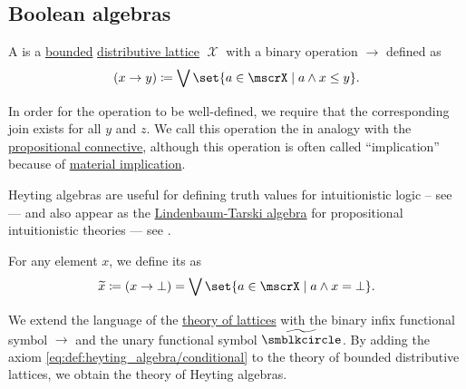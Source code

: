 \subsection{Boolean algebras}\label{subsec:boolean_algebras}

\begin{definition}\label{def:heyting_algebra}
  A  is a \hyperref[def:semilattice/bounded]{bounded} \hyperref[def:semilattice/distributive_lattice]{distributive lattice} \( \mscrX \) with a binary operation \( \rightarrow \) defined as
  \begin{equation}\label{eq:def:heyting_algebra/conditional}
    (x \rightarrow y) \coloneqq \bigvee\set{ a \in \mscrX \given a \wedge x \leq y }.
  \end{equation}

  In order for the operation to be well-defined, we require that the corresponding join exists for all \( y \) and \( z \). We call this operation the  in analogy with the \hyperref[def:propositional_language/connectives/conditional]{propositional connective}, although this operation is often called \enquote{implication} because of \hyperref[def:material_implication]{material implication}.

  Heyting algebras are useful for defining truth values for intuitionistic logic -- see  --- and also appear as the \hyperref[def:lindenbaum_tarski_algebra]{Lindenbaum-Tarski algebra} for propositional intuitionistic theories --- see .

  \begin{thmenum}
     For any element \( x \), we define its  as
    \begin{equation}\label{eq:def:heyting_algebra/pseudocomplement}
      \widetilde x
      \coloneqq
      (x \rightarrow \bot)
      =
      \bigvee\set{ a \in \mscrX \given a \wedge x = \bot }.
    \end{equation}

     We extend the language of the \hyperref[def:semilattice/theory]{theory of lattices} with the binary infix functional symbol \( \rightarrow \) and the unary functional symbol \( \widetilde{\placeholder} \). By adding the axiom \eqref{eq:def:heyting_algebra/conditional} to the theory of bounded distributive lattices, we obtain the theory of Heyting algebras.


\end{thmenum}
\end{definition}
